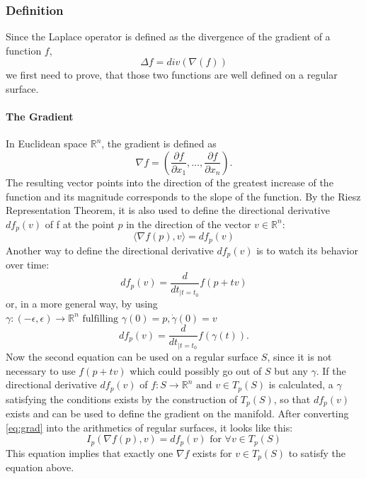 \subsubsection{Definition}
Since the Laplace operator is defined as the divergence of the gradient of a function $f$,
$$\Delta f = div(\nabla(f))$$
we first need to prove, that those two functions are well defined on a regular surface.

\paragraph{The Gradient}
In Euclidean space $\mathbb{R}^n$, the gradient is defined as
$$\nabla f = \left(\frac{\partial f}{\partial x_{1}}, \dots, \frac{\partial f}{\partial x_{n}}\right).$$
The resulting vector points into the direction of the greatest increase of the function and its magnitude corresponds to the slope of the function.
By the Riesz Representation Theorem, it is also used to define the directional derivative $d f_{p}(v)$ of f at the point $p$ in the direction of the vector $v \in \mathbb{R}^n$:
\begin{equation}
	\langle \nabla f(p), v \rangle = d f_{p}(v)
	\label{eq:grad}
\end{equation}
Another way to define the directional derivative $d f_p(v)$ is to watch its behavior over time:
\begin{equation*}
	d f_p(v) = \frac{d}{dt_{|t=t_0}} f(p + tv)
\end{equation*}
or, in a more general way, by using $\gamma : (-\epsilon, \epsilon) \rightarrow \mathbb{R}^n \mbox{ fulfilling } \gamma(0) = p, \dot{\gamma}(0) = v$
\begin{equation*}
	d f_p(v) = \frac{d}{dt_{|t=t_0}} f(\gamma(t)).
\end{equation*}
Now the second equation can be used on a regular surface $S$, since it is not necessary to use $f(p+tv)$ which could possibly go out of $S$ but any $\gamma$.
If the directional derivative $df_p(v)$ of $f: S \rightarrow \mathbb{R}^n \mbox{ and } v \in T_p(S)$ is calculated, a $\gamma$ satisfying the conditions exists by the construction of $T_p(S)$, so that $df_p(v)$ exists and can be used to define the gradient on the manifold.
After converting \eqref{eq:grad} into the arithmetics of regular surfaces, it looks like this:
\begin{equation*}
	I_p(\nabla f(p),v) = d f_p(v) \mbox{ for } \forall v \in T_p(S)
\end{equation*}
This equation implies that exactly one $\nabla f$ exists for $v \in T_p(S)$ to satisfy the equation above.

